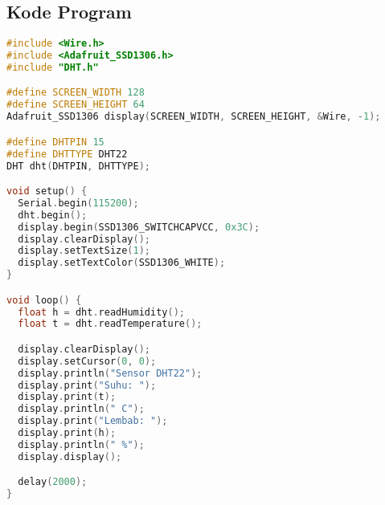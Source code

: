 \documentclass[12pt,a4paper]{article}
\begin{document}
\subsection{Kode Program}
\begin{lstlisting}[language=C++, caption={Sensor DHT22 dengan OLED Display}]
#include <Wire.h>
#include <Adafruit_SSD1306.h>
#include "DHT.h"

#define SCREEN_WIDTH 128
#define SCREEN_HEIGHT 64
Adafruit_SSD1306 display(SCREEN_WIDTH, SCREEN_HEIGHT, &Wire, -1);

#define DHTPIN 15
#define DHTTYPE DHT22
DHT dht(DHTPIN, DHTTYPE);

void setup() {
  Serial.begin(115200);
  dht.begin();
  display.begin(SSD1306_SWITCHCAPVCC, 0x3C);
  display.clearDisplay();
  display.setTextSize(1);
  display.setTextColor(SSD1306_WHITE);
}

void loop() {
  float h = dht.readHumidity();
  float t = dht.readTemperature();

  display.clearDisplay();
  display.setCursor(0, 0);
  display.println("Sensor DHT22");
  display.print("Suhu: ");
  display.print(t);
  display.println(" C");
  display.print("Lembab: ");
  display.print(h);
  display.println(" %");
  display.display();

  delay(2000);
}
\end{lstlisting}
\end{document}
